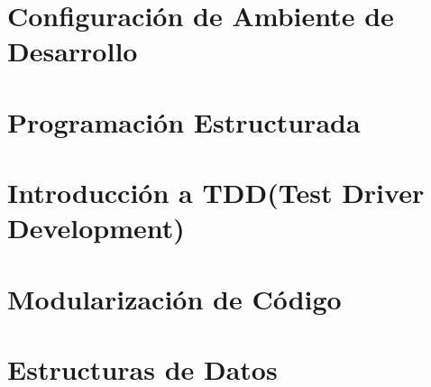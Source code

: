 \section{Configuración de Ambiente de Desarrollo}
\section{Programación Estructurada}
\section{Introducción a TDD(Test Driver Development)}
\section{Modularización de Código}
\section{Estructuras de Datos}

